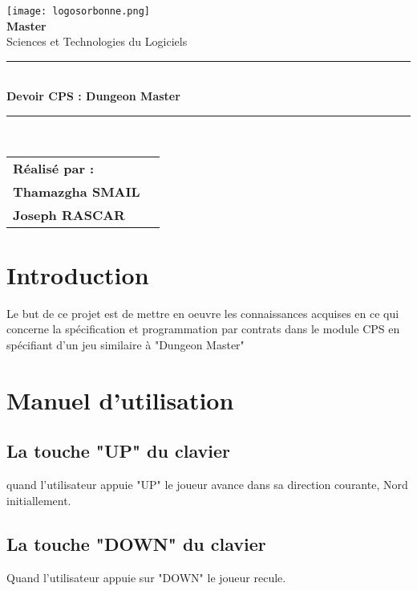 \documentclass{article}
\begin{document}
\begin{titlepage}
    \begin{center}
        \texttt{[image: logosorbonne.png]}\\[1cm]
        \textbf{\Large{Master}}\\
        \huge{Sciences et Technologies du Logiciels}\\
        \rule{\linewidth}{0.5mm} \\[0.4cm]
        { \huge \bfseries Devoir CPS : Dungeon Master\\[0.4cm] }
        \rule{\linewidth}{0.5mm} \\[1.5cm]
		\vspace{5mm}
    \end{center}	 
    \begin{flushleft}                                       
    \begin{tabular}{ll} 
    \textbf{Réalisé par :} 
    ~\\ 
    \textbf{Thamazgha SMAIL} \\
    \textbf{Joseph RASCAR} \\
    \end{tabular} 
    \end{flushleft} 
\end{titlepage}

\newpage
\thispagestyle{empty}
\tableofcontents
\newpage
\thispagestyle{empty}
\listoffigures



\newpage
\section{Introduction}
Le but de ce projet est de mettre en oeuvre les connaissances acquises en ce qui concerne la spécification et programmation par contrats dans le module CPS en spécifiant d’un jeu similaire à "Dungeon Master"

\section{Manuel d’utilisation}

\subsection{La touche "UP" du clavier}   quand l'utilisateur appuie "UP" le joueur avance dans sa direction courante, Nord initiallement.
\subsection{La touche "DOWN" du clavier }Quand l'utilisateur appuie sur "DOWN" le joueur recule.
\end{document}
